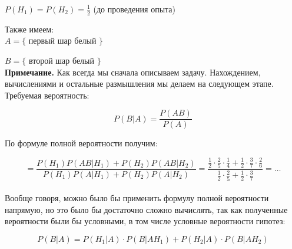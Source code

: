 \documentclass{article}
\begin{document}
$P(H_1) = P(H_2) = \frac{1}{2}$ (до проведения опыта)

Также имеем:
\\

$A = \{$ первый шар белый $\}$

$B = \{$ второй шар белый $\}$
\\

\textbf{Примечание.} Как всегда мы сначала описываем задачу. Нахождением, вычислениями и остальные размышления мы делаем на следующем этапе.
\\

Требуемая вероятность:

$$P(B | A) = \frac{P(AB)}{P(A)}$$

По формуле полной вероятности получим:

$$ = \frac{P(H_1) P(AB|H_1) + P(H_2) P(AB|H_2)}{ P(H_1) P(A|H_1) + P(H_2) P(A|H_2)}
= \frac{\frac{1}{2}\cdot\frac{2}{5}\cdot\frac{1}{4} + \frac{1}{2}\cdot\frac{3}{7}\cdot\frac{2}{6}}
{\frac{1}{2}\cdot \frac{2}{5} + \frac{1}{2} \cdot \frac{3}{7}} = \ldots$$
\\

Вообще говоря, можно было бы применить формулу полной вероятности напрямую, но это было бы достаточно сложно вычислять, так как полученные вероятности были бы условными, в том числе условные вероятности гипотез:

$$P(B|A) = P(H_1|A) \cdot P(B|AH_1) + P(H_2|A) \cdot P(B|AH_2)$$
\end{document}
